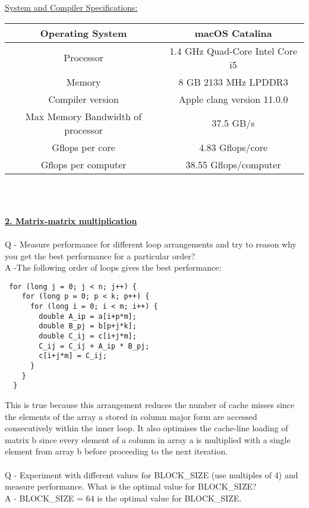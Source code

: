 \documentclass[12pt,letterpaper]{article}
\begin{document}
	

{\underline{System and Compiler Specifications:}} \\

\begin{tabular}{ |c|c| } 
 \hline
 Operating System & macOS Catalina  \\
 \hline
 Processor & 1.4 GHz Quad-Core Intel Core i5 \\
 \hline
 Memory & 8 GB 2133 MHz LPDDR3  \\ 
 \hline 
Compiler version & Apple clang version 11.0.0 \\

 \hline
 Max Memory Bandwidth of processor & 37.5 GB/s \\
 \hline
 Gflops per core & 4.83	Gflops/core\\
 \hline
 Gflops per computer & 38.55 Gflops/computer\\
 \hline
\end{tabular}
\\\


\underline{\textbf{2. Matrix-matrix multiplication}} \\\\
Q - Measure performance for different loop arrangements and
try to reason why you get the best performance for a particular order?\\
A -The following order of loops gives the best performance: 
\begin{verbatim}
 for (long j = 0; j < n; j++) {
    for (long p = 0; p < k; p++) {
      for (long i = 0; i < m; i++) {
        double A_ip = a[i+p*m];
        double B_pj = b[p+j*k];
        double C_ij = c[i+j*m];
        C_ij = C_ij + A_ip * B_pj;
        c[i+j*m] = C_ij;
      }
    }
  }
\end{verbatim}
This is true because this arrangement reduces the number of cache misses since the elements of the array a stored in column major form are accessed consecutively within the inner loop. It also optimises the cache-line loading of matrix b since every element of a column in array a is multiplied with a single element from array b before proceeding to the next iteration. \\\\

 

Q - Experiment with different values for BLOCK\_SIZE (use multiples of 4) and measure performance.  What is the optimal value for BLOCK\_SIZE? \\
A - BLOCK\_SIZE = 64 is the optimal value for BLOCK\_SIZE. 
\\\\
\end{document}
